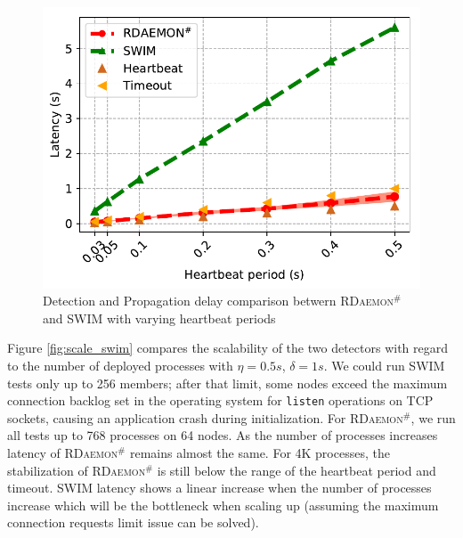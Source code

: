 \documentclass[sigconf]{acmart}
\newcommand{\ourwork}[0]{\textsc{RDaemon}\ensuremath{^\#}\xspace}
\begin{document}
\begin{figure}[h]
  \centering
  \includegraphics[width=\linewidth]{HB_prrte_swim.pdf}
  \caption{Detection and Propagation delay comparison betwern \ourwork and SWIM with varying heartbeat periods}
  \label{fig:hb_prrte_swim}
\end{figure}


Figure \ref{fig:scale_swim} compares the scalability of the two detectors with regard to the number of deployed processes with $\eta = 0.5s$, $\delta = 1s$.
We could run SWIM tests only up to 256 members; after that limit, some nodes exceed the maximum connection backlog
set in the operating system for \texttt{listen} operations on TCP sockets, causing an application crash during
initialization. For \ourwork,
we run all tests up to 768 processes on 64 nodes.
%
As the number of processes increases latency of \ourwork remains almost the same.
For 4K processes, the stabilization of \ourwork is still below the range of the heartbeat period and timeout.
SWIM latency shows a linear increase when the number of processes increase which will be the bottleneck when scaling up (assuming the maximum connection requests limit issue can be solved).
\end{document}
